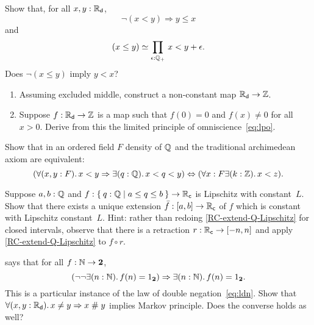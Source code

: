 \begin{ex} \label{ex:RD-lt-vs-le}
  Show that, for all $x, y : \mathbb{R}_\mathsf{d}$,
  \begin{equation*}
    \lnot (x < y) \Rightarrow y \leq x
  \end{equation*}
  and
  \begin{equation*}
    \eqv{(x \leq y)}{\prd{\epsilon : \Qp} x < y + \epsilon}.
  \end{equation*}
  Does $\lnot (x \leq y)$ imply $y < x$?
\end{ex}

\begin{ex} \label{ex:reals-non-constant-into-Z}
  \mbox{}
  \begin{enumerate}
  \item 
    Assuming excluded middle, construct a non-constant map $\mathbb{R}_\mathsf{d} \to \mathbb{Z}$.
  \item 
    Suppose $f : \mathbb{R}_\mathsf{d} \to \mathbb{Z}$ is a map such that $f(0) = 0$ and $f(x) \neq 0$ for all $x >
    0$. Derive from this the limited principle of omniscience~\eqref{eq:lpo}.
  \end{enumerate}
\end{ex}

\begin{ex} \label{ex:traditional-archimedean}
  Show that in an ordered field $F$ density of $\mathbb{Q}$ and the traditional archimedean axiom
  are equivalent:
  \begin{equation*}
    (\fall{x, y : F} x < y \Rightarrow \exis{q : \Q} x < q < y)
    \Leftrightarrow
    (\forall{x : F} \exis{k : \Z} x < z).
  \end{equation*}  
\end{ex}

\begin{ex} \label{RC-Lipschitz-on-interval} Suppose $a, b : \mathbb{Q}$ and $f : \setof{ q : \Q |
    a \leq q \leq b } \to \RC$ is Lipschitz with constant~$L$. Show that there exists a unique
  extension $\bar{f} : [a,b] \to \mathbb{R}_\mathsf{c}$ of $f$ which is constant with Lipschitz
  constant~$L$. Hint: rather than redoing \autoref{RC-extend-Q-Lipschitz} for closed
  intervals, observe that there is a retraction $r : \mathbb{R}_\mathsf{c} \to [-n,n]$ and apply
  \autoref{RC-extend-Q-Lipschitz} to $f \circ r$.
\end{ex}

\begin{ex} \label{ex:reals-apart-neq-MP}
   says that for all $f : \mathbb{N} \to \mathbf{2}$,
  \begin{equation*}
    (\lnot \lnot \exis{n : \nat} f(n) = \btrue)
    \Rightarrow
    \exis{n : \nat} f(n) = \btrue.
  \end{equation*}
  This is a particular instance of the law of double negation~\eqref{eq:ldn}. Show that
  $\fall{x, y: \RD} x \neq y \Rightarrow x \apart y$ implies Markov principle. Does the
  converse holds as well?
\end{ex}

